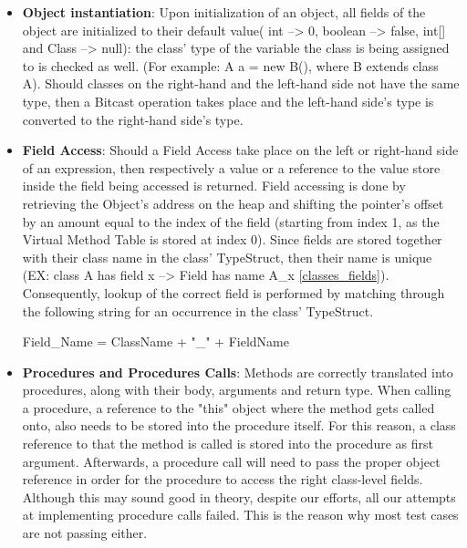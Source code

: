 \documentclass[paper=a4, fontsize=11pt]{scrartcl}
\numberwithin{equation}{section}		%
\numberwithin{figure}{section}			%
\numberwithin{table}{section}				%
\begin{document}
\begin{itemize}
\begin{figure}[h]
	\end{figure}
	
		\item \textbf{Object instantiation}:  Upon initialization of an object, all fields of the object are initialized to their default value( int --> 0, boolean --> false, int[] and Class --> null): the class' type of the variable the class is being assigned to is checked as well. (For example: A a = new B(), where B extends class A). Should classes on the right-hand and the left-hand side not have the same type, then a Bitcast operation takes place and the left-hand side's type is converted to the right-hand side's type. 

	\item \textbf{Field Access}: Should a Field Access take place on the left or right-hand side of an expression, then respectively a value or a reference to the value store inside the field being accessed is returned. Field accessing is done by retrieving the Object's address on the heap and shifting the pointer's offset by an amount equal to the index of the field (starting from index 1, as the Virtual Method Table is stored at index 0). Since fields are stored together with their class name in the class' TypeStruct, then their name is unique (EX: class A has field x --> Field has name A\_x \ref{classes_fields}). Consequently, lookup of the correct field is performed by matching through the following string for an occurrence in the class' TypeStruct.
	\begin{center}
Field\_Name = ClassName + "\_" + FieldName
\end{center}	

\item \textbf{Procedures and Procedures Calls}: Methods are correctly translated into procedures, along with their body, arguments and return type. When calling a procedure, a reference to the "this" object where the method gets called onto, also needs to be stored into the procedure itself. For this reason, a class reference to that the method is called is stored into the procedure as first argument. Afterwards, a procedure call will need to pass the proper object reference in order for the procedure to access the right class-level fields. Although this may sound good in theory, despite our efforts, all our attempts at implementing procedure calls failed. This is the reason why most test cases are not passing either. 
	

	
\end{itemize}
\end{document}
